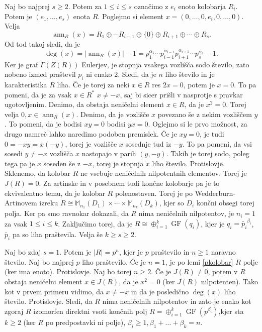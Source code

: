 \documentclass[a4paper, 12pt]{amsart}
\theoremstyle{definition} %
\theoremstyle{plain} %
\newcommand{\M}{\mathbb M}
\DeclareMathOperator{\ann}{ann}
\DeclareMathOperator{\GF}{GF}
\begin{document}
Naj bo najprej $s\ge 2$. Potem za $1 \le i \le s$ označimo z $e_i$ enoto kolobarja $R_i$. Potem je $(e_1, \dots, e_s)$ enota $R$. Poglejmo si element $x = (0,\dots, 0,e_i,0,\dots,0)$. Velja
$$
\ann_R(x) = R_1\oplus  \cdots R_{i-1} \oplus \{ 0 \} \oplus R_{i+1} \oplus \cdots \oplus R_{s}.
$$  
Od tod takoj sledi, da je
$$
\deg(x) = |\ann_R(x)| - 1 = p_1^{\alpha_1} \cdots p_{i-1}^{\alpha_{i-1}} p_{i+1}^{\alpha_{i+1}} \cdots p_s^{\alpha_s} - 1.
$$
Ker je graf $\Gamma(Z(R))$ Eulerjev, je stopnja vsakega vozlišča sodo število, zato nobeno izmed praštevil $p_i$ ni enako 2. Sledi, da je $n$ liho število in je karakteristika $R$ liha. Če je torej za neki $x\in R$ res $2x = 0$, potem je $x=0$. To pa pomeni, da je za vsak $x\in R^*$ $x\neq -x$, saj bi sicer prišli v nasprotje s pravkar ugotovljenim. Denimo, da obstaja neničelni element $x\in R$, da je $x^2 = 0$. Torej velja $0,x\in \ann_R(x)$. Denimo, da je vozlišče $x$ povezano še z nekim vozliščem $y$. To pomeni, da je bodisi $xy=0$ bodisi $yx=0$. Oglejmo si le prvo možnost, za drugo namreč lahko naredimo podoben premislek. Če je $xy = 0$, je tudi $0=-xy=x(-y)$, torej je vozlišče $x$ sosednje tud iz $-y$. To pa pomeni, da vsi sosedi $y\neq -x$ vozlišča $x$ nastopajo v parih $(y,-y)$. Takih je torej sodo, poleg tega pa je $x$ soseden še z $-x$, torej je stopnja $x$ liho število. Protislovje. Sklenemo, da kolobar $R$ ne vsebuje neničelnih nilpotentnih elementov. Torej je $J(R)=0$. Za artinske in v posebnem tudi končne kolobarje pa je to ekvivalentno temu, da je kolobar $R$ polenostaven. Torej je po Wedderburn-Artinovem izreku $R\cong \M_{n_1}(D_1)\times \cdots \times \M_{n_k}(D_k)$, kjer so $D_i$ končni obsegi torej polja. Ker pa smo ravnokar dokazali, da $R$ nima neničelnih nilpotentov, je $n_i= 1$ za vsak $1\le i \le k$. Zaključimo torej, da je $R\cong \oplus_{i=1}^k \GF(q_i)$, kjer je $q_i = \tilde{p_i}^{\beta_i}$, $\tilde{p_i}$ pa so liha praštevila. Velja še $k\ge s \ge 2$.

Naj bo zdaj $s=1$. Potem je $|R| = p^n$, kjer je $p$ praštevilo in $n\ge1$ naravno število. Naj bo najprej $p$ liho praštevilo. Če je $n=1$, je po lemi \ref{pkolobar} $R$ polje (ker ima enoto). Protislovje. Naj bo torej $n\ge 2$. Če je $J(R) \neq 0$, potem v $R$ obstaja neničelni element $x\in J(R)$, da je $x^2 = 0$ (ker $J(R)$ nilpotenten). Tako kot v prvem primeru vidimo, da $x\neq -x$ in da je posledično $\deg(x)$ liho število. Protislovje. Sledi, da $R$ nima neničelnih nilpotentov in  zato je enako kot zgoraj $R$ izomorfen direktni vsoti končnih polj $R=\oplus_{i=1}^k \GF(p^{\beta_i})$,kjer sta  $k\ge 2$ (ker $R$ po predpostavki ni polje), $\beta_i \ge 1, \beta_1 + \dots + \beta_k = n$.
\end{document}
